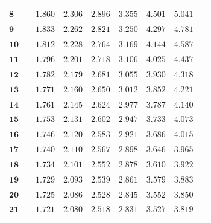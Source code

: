 \begin{customTableWrapper}{1.3}
\begin{longtable}{|l|l l|l|l|l|l|l|l|}
    $\mathbf{8}$ & & ${1.860}$   & ${2.306}$   & ${2.896}$   & ${3.355}$   & ${4.501}$   & ${5.041}$   \\ \hline
    
    $\mathbf{9}$ & & ${1.833}$   & ${2.262}$   & ${2.821}$   & ${3.250}$   & ${4.297}$   & ${4.781}$   \\ \hline
    
    $\mathbf{10}$ & & ${1.812}$   & ${2.228}$   & ${2.764}$   & ${3.169}$   & ${4.144}$   & ${4.587}$   \\ \hline
    
    $\mathbf{11}$ & & ${1.796}$   & ${2.201}$   & ${2.718}$   & ${3.106}$   & ${4.025}$   & ${4.437}$   \\ \hline
    
    $\mathbf{12}$ & & ${1.782}$   & ${2.179}$   & ${2.681}$   & ${3.055}$   & ${3.930}$   & ${4.318}$   \\ \hline
    
    $\mathbf{13}$ & & ${1.771}$   & ${2.160}$   & ${2.650}$   & ${3.012}$   & ${3.852}$   & ${4.221}$   \\ \hline
    
    $\mathbf{14}$ & & ${1.761}$   & ${2.145}$   & ${2.624}$   & ${2.977}$   & ${3.787}$   & ${4.140}$   \\ \hline
    
    $\mathbf{15}$ & & ${1.753}$   & ${2.131}$   & ${2.602}$   & ${2.947}$   & ${3.733}$   & ${4.073}$   \\ \hline
    
    $\mathbf{16}$ & & ${1.746}$   & ${2.120}$   & ${2.583}$   & ${2.921}$   & ${3.686}$   & ${4.015}$   \\ \hline
    
    $\mathbf{17}$ & & ${1.740}$   & ${2.110}$   & ${2.567}$   & ${2.898}$   & ${3.646}$   & ${3.965}$   \\ \hline
    
    $\mathbf{18}$ & & ${1.734}$   & ${2.101}$   & ${2.552}$   & ${2.878}$   & ${3.610}$   & ${3.922}$   \\ \hline
    
    $\mathbf{19}$ & & ${1.729}$   & ${2.093}$   & ${2.539}$   & ${2.861}$   & ${3.579}$   & ${3.883}$   \\ \hline
    
    $\mathbf{20}$ & & ${1.725}$   & ${2.086}$   & ${2.528}$   & ${2.845}$   & ${3.552}$   & ${3.850}$   \\ \hline
    
    $\mathbf{21}$ & & ${1.721}$   & ${2.080}$   & ${2.518}$   & ${2.831}$   & ${3.527}$   & ${3.819}$   \\ \hline
    

\end{longtable}
\end{customTableWrapper}

